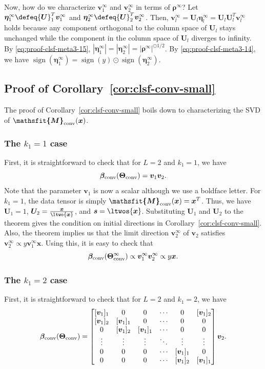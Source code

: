 \documentclass{article} %
\def\vs{{\bm{s}}}
\def\vv{{\bm{v}}}
\def\vx{{\bm{x}}}
\def\mU{{\bm{U}}}
\newcommand{\tens}[1]{\bm{\mathsfit{#1}}}
\def\tM{{\tens{M}}}
\DeclareMathOperator{\sign}{sign}
\newcommand{\vbeta}{{\bm{\beta}}}
\newcommand{\vbetaconv}{\vbeta_{\rm conv}}
\newcommand{\bTheta}{\bm{\Theta}}
\newcommand{\bThetaconv}{\bTheta_{\rm conv}}
\newcommand{\tMconv}{\tM_{\rm conv}}
\newcommand{\vrho}{{\bm{\rho}}}
\newcommand{\veta}{{\bm{\eta}}}
\begin{document}
Now, how do we characterize $\vv_1^\infty$ and $\vv_2^\infty$ in terms of $\vrho^\infty$?
Let $\veta_1^\infty \defeq \mU_1^T \vv_1^\infty$ and $\veta_2^\infty \defeq \mU_2^T \vv_2^\infty$.
Then, $\vv_l^\infty = \mU_l \veta_l^\infty = \mU_l \mU_l^T \vv_l^\infty$ holds because any component orthogonal to the column space of $\mU_l$ stays unchanged while the component in the column space of $\mU_l$ diverges to infinity.
By \eqref{eq:proof-clsf-meta3-15}, $|\veta_1^\infty| = |\veta_2^\infty| = |\vrho^\infty|^{\odot 1/2}$.
By \eqref{eq:proof-clsf-meta3-14}, we have $\sign(\veta_1^\infty) = \sign(y)\odot\sign(\veta_2^\infty)$.

\subsection{Proof of Corollary~\ref{cor:clsf-conv-small}}
The proof of Corollary~\ref{cor:clsf-conv-small} boils down to characterizing the SVD of $\tMconv(\vx)$.

\subsubsection{The $k_1 = 1$ case}
First, it is straightforward to check that for $L=2$ and $k_1 = 1$, we have
\begin{equation*}
    \vbetaconv(\bThetaconv) = \vv_1 \vv_2.
\end{equation*}
Note that the parameter $\vv_1$ is now a scalar although we use a boldface letter.
For $k_1 = 1$, the data tensor is simply $\tMconv(\vx) = \vx^T$. Thus, we have $\mU_1 = 1$, $\mU_2 = \frac{\vx}{\ltwo{\vx}}$, and $\vs = \ltwos{\vx}$.
Substituting $\mU_1$ and $\mU_2$ to the theorem gives the condition on initial directions in Corollary~\ref{cor:clsf-conv-small}. Also, the theorem implies us that the limit direction $\vv_2^\infty$ of $\vv_2$ satisfies $\vv_2^\infty \propto y \vv_1^\infty \vx$. Using this, it is easy to check that
\begin{equation*}
    \vbetaconv(\bThetaconv^\infty) \propto \vv_1^\infty \vv_2^\infty \propto y\vx.
\end{equation*}

\subsubsection{The $k_1 = 2$ case}
First, it is straightforward to check that for $L=2$ and $k_1 = 2$, we have
\begin{equation}
\label{eq:proof-cor-clsf-conv-small-1}
    \vbetaconv(\bThetaconv)
    = \begin{bmatrix}
    [\vv_1]_1 & 0 & 0 & \cdots & 0 & [\vv_1]_2\\
    [\vv_1]_2 & [\vv_1]_1 & 0 & \cdots & 0 & 0\\
    0 & [\vv_1]_2 & [\vv_1]_1 & \cdots & 0 & 0 \\
    \vdots & \vdots & \vdots & \ddots & \vdots & \vdots\\
    0 & 0 & 0 & \cdots & [\vv_1]_1 & 0\\
    0 & 0 & 0 & \cdots & [\vv_1]_2 & [\vv_1]_1
    \end{bmatrix}
    \vv_2.
\end{equation}
\end{document}
